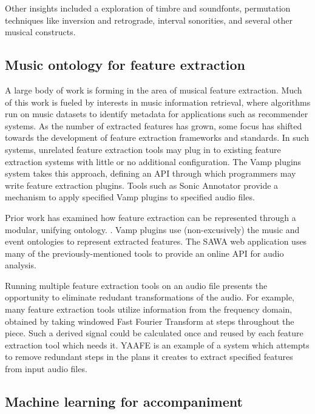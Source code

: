 \documentclass[11pt,conference,letterpaper]{IEEEtran}
\begin{document}
Other insights included a exploration of timbre and soundfonts, permutation techniques like inversion and retrograde, interval sonorities, and several other musical constructs.

\subsection{Music ontology for feature extraction}

A large body of work is forming in the area of musical feature extraction. Much of this work is fueled by interests in music information retrieval, where algorithms run on music datasets to identify metadata for applications such as recommender systems. As the number of extracted features has grown, some focus has shifted towards the development of feature extraction frameworks and standards. In such systems, unrelated feature extraction tools may plug in to existing feature extraction systems with little or no additional configuration. The Vamp plugins system takes this approach, defining an API through which programmers may write feature extraction plugins. Tools such as Sonic Annotator provide a mechanism to apply specified Vamp plugins to specified audio files.

Prior work has examined how feature extraction can be represented through a modular, unifying ontology. \cite{raimond2008web}. Vamp plugins use (non-excusively) the music \cite{raimond2007music} and event \cite{raimond2007event} ontologies to represent extracted features. The SAWA web application \cite{fazekas2009reusable} uses many of the previously-mentioned tools to provide an online API for audio analysis.


Running multiple feature extraction tools on an audio file presents the opportunity to eliminate redudant transformations of the audio. For example, many feature extraction tools utilize information from the frequency domain, obtained by taking windowed Fast Fourier Transform at steps throughout the piece. Such a derived signal could be calculated once and reused by each feature extraction tool which needs it. YAAFE \cite{mathieu2010yaafe} is an example of a system which attempts to remove redundant steps in the plans it creates to extract specified features from input audio files.

\subsection{Machine learning for accompaniment}
\end{document}
